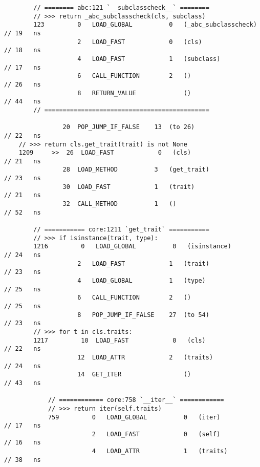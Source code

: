 \begin{code}
\begin{verbatim}
        // ======== abc:121 `__subclasscheck__` ========
        // >>> return _abc_subclasscheck(cls, subclass)
        123         0   LOAD_GLOBAL          0   (_abc_subclasscheck)                               // 19   ns
                    2   LOAD_FAST            0   (cls)                                              // 18   ns
                    4   LOAD_FAST            1   (subclass)                                         // 17   ns
                    6   CALL_FUNCTION        2   ()                                                 // 26   ns
                    8   RETURN_VALUE             ()                                                 // 44   ns
        // =============================================

                20  POP_JUMP_IF_FALSE    13  (to 26)                                                // 22   ns
    // >>> return cls.get_trait(trait) is not None
    1209     >>  26  LOAD_FAST            0   (cls)                                                 // 21   ns
                28  LOAD_METHOD          3   (get_trait)                                            // 23   ns
                30  LOAD_FAST            1   (trait)                                                // 21   ns
                32  CALL_METHOD          1   ()                                                     // 52   ns

        // =========== core:1211 `get_trait` ===========
        // >>> if isinstance(trait, type):
        1216         0   LOAD_GLOBAL          0   (isinstance)                                      // 24   ns
                    2   LOAD_FAST            1   (trait)                                            // 23   ns
                    4   LOAD_GLOBAL          1   (type)                                             // 25   ns
                    6   CALL_FUNCTION        2   ()                                                 // 25   ns
                    8   POP_JUMP_IF_FALSE    27  (to 54)                                            // 23   ns
        // >>> for t in cls.traits:
        1217         10  LOAD_FAST            0   (cls)                                             // 22   ns
                    12  LOAD_ATTR            2   (traits)                                           // 24   ns
                    14  GET_ITER                 ()                                                 // 43   ns

            // ============ core:758 `__iter__` ============
            // >>> return iter(self.traits)
            759         0   LOAD_GLOBAL          0   (iter)                                         // 17   ns
                        2   LOAD_FAST            0   (self)                                         // 16   ns
                        4   LOAD_ATTR            1   (traits)                                       // 38   ns


\end{verbatim}
\end{code}
